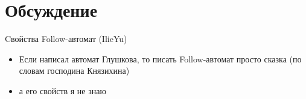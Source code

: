 \documentclass[mathserif]{beamer}
\begin{document}
\section{Обсуждение}
\begin{frame}{Cвойства Follow-автомат (IlieYu)}
    \begin{itemize}
        \item Если написал автомат Глушкова, то писать Follow-автомат просто сказка (по словам господина Князихина)
        \item а его свойств я не знаю
    \end{itemize}
\end{frame}
\end{document}
